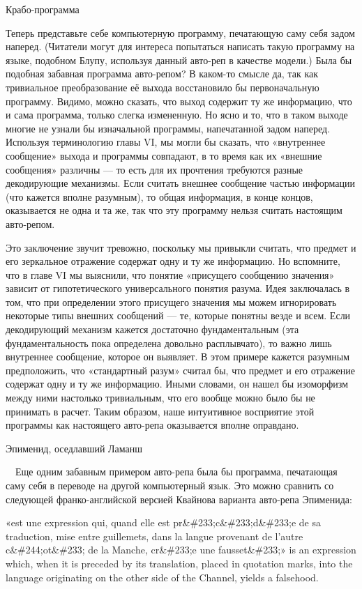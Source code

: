\documentclass[../main.tex]{subfiles}
\begin{document}
Крабо-программа

Теперь представьте себе компьютерную программу, печатающую саму себя задом наперед. (Читатели могут для интереса попытаться написать такую программу на языке, подобном Блупу, используя данный авто-реп в качестве модели.) Была бы подобная забавная программа авто-репом? В каком-то смысле да, так как тривиальное преобразование её выхода восстановило бы первоначальную программу. Видимо, можно сказать, что выход содержит ту же информацию, что и сама программа, только слегка измененную. Но ясно и то, что в таком выходе многие не узнали бы изначальной программы, напечатанной задом наперед. Используя терминологию главы VI, мы могли бы сказать, что «внутреннее сообщение» выхода и программы совпадают, в то время как их «внешние сообщения» различны --- то есть для их прочтения требуются разные декодирующие механизмы. Если считать внешнее сообщение частью информации (что кажется вполне разумным), то общая информация, в конце концов, оказывается не одна и та же, так что эту программу нельзя считать настоящим авто-репом.

Это заключение звучит тревожно, поскольку мы привыкли считать, что предмет и его зеркальное отражение содержат одну и ту же информацию. Но вспомните, что в главе VI мы выяснили, что понятие «присущего сообщению значения» зависит от гипотетического универсального понятия разума. Идея заключалась в том, что при определении этого присущего значения мы можем игнорировать некоторые типы внешних сообщений --- те, которые понятны везде и всем. Если декодирующий механизм кажется достаточно фундаментальным (эта фундаментальность пока определена довольно расплывчато), то важно лишь внутреннее сообщение, которое он выявляет. В этом примере кажется разумным предположить, что «стандартный разум» считал бы, что предмет и его отражение содержат одну и ту же информацию. Иными словами, он нашел бы изоморфизм между ними настолько тривиальным, что его вообще можно было бы не принимать в расчет. Таким образом, наше интуитивное восприятие этой программы как настоящего авто-репа оказывается вполне оправдано.

Эпименид, оседлавший Ламанш

~~Еще одним забавным примером авто-репа была бы программа, печатающая саму себя в переводе на другой компьютерный язык. Это можно сравнить со следующей франко-английской версией Квайнова варианта авто-репа Эпименида:

«est une expression qui, quand elle est pr\&\#233;c\&\#233;d\&\#233;e de sa traduction, mise entre guillemets, dans la langue provenant de l'autre c\&\#244;ot\&\#233; de la Manche, cr\&\#233;e une fausset\&\#233;» is an expression which, when it is preceded by its translation, placed in quotation marks, into the language originating on the other side of the Channel, yields a falsehood.
\end{document}
